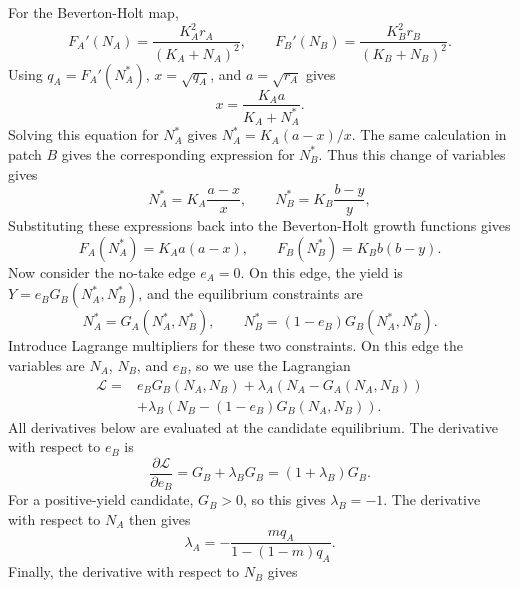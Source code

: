 \documentclass{article}
\numberwithin{equation}{section}
\begin{document}
For the Beverton-Holt map,
\begin{equation*}
    F_A'(N_A)=\frac{K_A^2r_A}{(K_A+N_A)^2},
    \qquad
    F_B'(N_B)=\frac{K_B^2r_B}{(K_B+N_B)^2}.
\end{equation*}
Using $q_A=F_A'(N_A^*)$, $x=\sqrt{q_A}$, and $a=\sqrt{r_A}$ gives
\begin{equation*}
    x=\frac{K_Aa}{K_A+N_A^*}.
\end{equation*}
Solving this equation for $N_A^*$ gives
$N_A^*=K_A(a-x)/x$. The same calculation in patch $B$ gives the
corresponding expression for $N_B^*$. Thus this change of variables gives
\begin{equation}
    \label{eq:no-take-population-recovery}
    N_A^*=K_A\frac{a-x}{x},
    \qquad
    N_B^*=K_B\frac{b-y}{y},
\end{equation}
Substituting these expressions back into the Beverton-Holt growth
functions gives
\begin{equation*}
    F_A(N_A^*)=K_Aa(a-x),
    \qquad
    F_B(N_B^*)=K_Bb(b-y).
\end{equation*}
Now consider the no-take edge $e_A=0$. On this edge, the yield is
$Y=e_BG_B(N_A^*,N_B^*)$, and the equilibrium constraints are
\begin{equation*}
    N_A^*=G_A(N_A^*,N_B^*),
    \qquad
    N_B^*=(1-e_B)G_B(N_A^*,N_B^*).
\end{equation*}
Introduce Lagrange multipliers for these two constraints. On this edge
the variables are $N_A$, $N_B$, and $e_B$, so we use the Lagrangian
\begin{equation*}
    \begin{aligned}
    \mathcal{L}
    ={}&e_BG_B(N_A,N_B)
    +\lambda_A\left(N_A-G_A(N_A,N_B)\right)\\
    &+\lambda_B\left(N_B-(1-e_B)G_B(N_A,N_B)\right).
    \end{aligned}
\end{equation*}
All derivatives below are evaluated at the candidate equilibrium. The
derivative with respect to $e_B$ is
\begin{equation*}
    \frac{\partial\mathcal{L}}{\partial e_B}
    =
    G_B+\lambda_BG_B
    =
    (1+\lambda_B)G_B.
\end{equation*}
For a positive-yield candidate, $G_B>0$, so this gives
$\lambda_B=-1$. The derivative with respect to $N_A$ then gives
\begin{equation*}
    \lambda_A
    =
    -\frac{m q_A}{1-(1-m)q_A}.
\end{equation*}
Finally, the derivative with respect to $N_B$ gives
\end{document}
